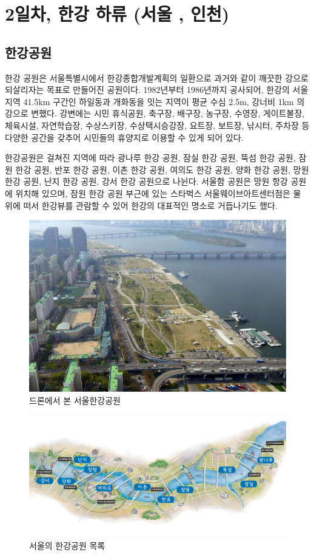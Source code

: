 \chapter{2일차, 한강 하류 (서울 , 인천)}
\section{한강공원}

한강 공원은 서울특별시에서 한강종합개발계획의 일환으로 과거와 같이 깨끗한 강으로
되살리자는 목표로 만들어진 공원이다. 1982년부터 1986년까지 공사되어, 한강의 서울
지역 41.5km 구간인 하일동과 개화동을 잇는 지역이 평균 수심 2.5m, 강너비 1km 의
강으로 변했다. 강변에는 시민 휴식공원, 축구장, 배구장, 농구장, 수영장, 게이트볼장, 
체육시설, 자연학습장, 수상스키장, 수상택시승강장, 요트장, 보트장, 낚시터, 주차장 등 다양한
공간을 갖추어 시민들의 휴양지로 이용할 수 있게 되어 있다.


한강공원은 걸쳐진 지역에 따라 광나루 한강 공원, 잠실 한강 공원, 뚝섬 한강 공원,
잠원 한강 공원, 반포 한강 공원, 이촌 한강 공원, 여의도 한강 공원, 양화 한강 공원, 
망원한강 공원, 난지 한강 공원, 강서 한강 공원으로 나뉜다. 서울함 공원은 망원 항강 공원에
위치해 있으며, 잠원 한강 공원 부근에 있는 스타벅스 서울웨이브아트센터점은 물 위에 
떠서 한강뷰를 관람할 수 있어 한강의 대표적인 명소로 거듭나기도 했다.

\begin{figure}
    \centering
    \includegraphics[width=.6\textwidth]{e_img/ww_-000_low.jpg}
    \caption{드론에서 본 서울한강공원}
    \label{fig:haryu1}
\end{figure}


\begin{figure}
    \centering
    \includegraphics[width=.6\textwidth]{e_img/hanriver.jpg}
    \caption{서울의 한강공원 목록\protect\footnotemark}
    \label{fig:haryu2}
\end{figure}

